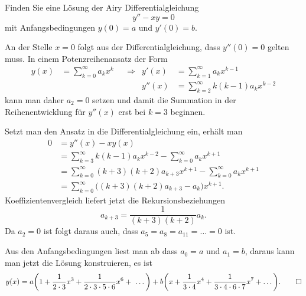 Finden Sie eine Lösung der Airy Differentialgleichung
\[
y''-xy=0
\]
mit Anfangsbedingungen $y(0)=a$ und $y'(0)=b$.

\begin{loesung}
An der Stelle $x=0$ folgt aus der Differentialgleichung, dass $y''(0)=0$
gelten muss.
In einem Potenzreihenansatz der Form
\begin{align*}
y(x)
&=
\sum_{k=0}^\infty a_kx^k
&&\Rightarrow&
y'(x)
&=
\sum_{k=1}^\infty a_kx^{k-1}
\\
&&&&
y''(x)
&=
\sum_{k=2}^\infty k(k-1)a_kx^{k-2}
\end{align*}
kann man daher $a_2=0$ setzen und damit die Summation in der
Reihenentwicklung für $y''(x)$ erst bei $k=3$ beginnen.

Setzt man den Ansatz in die Differentialgleichung ein, erhält man
\begin{align*}
0
&=
y''(x)-xy(x)
\\
&=
\sum_{k=3}^\infty k(k-1)a_kx^{k-2}
-
\sum_{k=0}^\infty a_kx^{k+1}
\\
&=
\sum_{k=0}^\infty (k+3)(k+2)a_{k+3}x^{k+1}
-
\sum_{k=0}^\infty a_{k}x^{k+1}
\\
&=
\sum_{k=0}^\infty \bigl((k+3)(k+2)a_{k+3}-a_{k}\bigr)x^{k+1}.
\end{align*}
Koeffizientenvergleich liefert jetzt die Rekursionsbeziehungen
\[
a_{k+3} = \frac1{(k+3)(k+2)} {a_k}.
\]
Da $a_2=0$ ist folgt daraus auch, dass $a_5=a_8=a_{11}=\dots=0$ ist.

Aus den Anfangsbedingungen liest man ab dass $a_0=a$ und $a_1=b$, daraus
kann man jetzt die Lösung konstruieren, es ist
\[
y(x)
=
a\biggl(1+\frac{1}{2\cdot 3}x^3 + \frac{1}{2\cdot3\cdot5\cdot 6}x^6 + \dots\biggr)
+
b\biggl(x+\frac{1}{3\cdot 4}x^4 + \frac{1}{3\cdot 4\cdot 6\cdot 7}x^7+\dots\biggr).
\qedhere
\]
\end{loesung}
